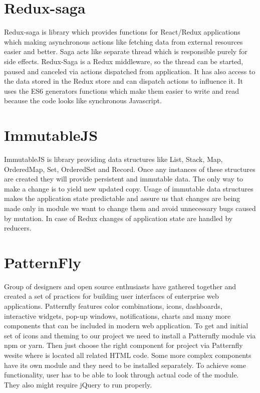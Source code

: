 \section{Redux-saga}
Redux-saga\cite{redux-saga} is library which provides functions for React/Redux applications which making asynchronous actions like fetching data from external resources easier and better. Saga acts like separate thread which is responsible purely for side effects. Redux-Saga is a Redux middleware, so the thread can be started, paused and canceled via actions dispatched from application. It has also access to the data stored in the Redux store and can dispatch actions to influence it. It uses the ES6 generators functions which make them easier to write and read because the code looks like synchronous Javascript.

\section{ImmutableJS}
ImmutableJS\cite{immutable} is library providing data structures like List, Stack, Map, OrderedMap, Set, OrderedSet and Record. Once any instances of these structures are created they will provide persistent and immutable data. The only way to make a change is to yield new updated copy. Usage of immutable data structures makes the application state predictable and assure us that changes are being made only in module we want to change them and avoid unnecessary bugs caused by mutation. In case of Redux changes of application state are handled by reducers.

\section{PatternFly}
Group of designers and open source enthusiasts have gathered together and created a set of practices for building user interfaces of enterprise web applications. Patternfly features color combinations, icons, dashboards, interactive widgets, pop-up windows, notifications, charts and many more components that can be included in modern web application. To get and initial set of icons and theming to our project we need to install a Patternfly module via npm\cite{npm} or yarn\cite{yarn}. Then just choose the right component for project via Patternfly wesite\cite{Patternfly} where is located all related HTML code. Some more complex components have its own module and they need to be installed separately. To achieve some functionality, user has to be able to look through actual code of the module. They also might require jQuery to run properly.

